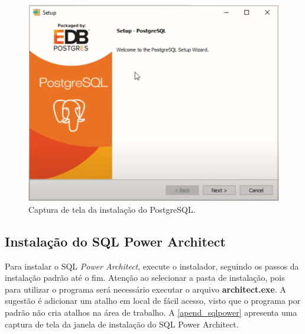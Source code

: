 \begin{apendicesenv}
\begin{figure}[htb]
	\caption{\label{apend_instalacaopostgres}Captura de tela da instalação do PostgreSQL.}
	\begin{center}
	    \includegraphics[scale=0.7]{Imagens/apendice postgres.png}
	\end{center}
\end{figure}

\subsection{Instalação do SQL Power Architect}
Para instalar o SQL \textit{Power Architect}, execute o instalador, seguindo os passos da instalação padrão até o fim. Atenção ao selecionar a pasta de instalação, pois para utilizar o programa será necessário executar o arquivo \textbf{architect.exe}. A sugestão é adicionar um atalho em local de fácil acesso, visto que o programa por padrão não cria atalhos na área de trabalho. A \autoref{apend_sqlpower} apresenta uma captura de tela da janela de instalação do SQL Power Architect.


\end{apendicesenv}
